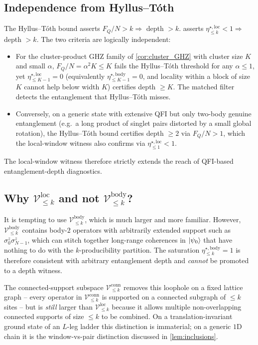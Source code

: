 \documentclass[11pt,a4paper]{article}
\newcommand{\FQ}{F_Q}
\newcommand{\PsiZ}{\ket{\psi_0}}
\newcommand{\Vbody}[1]{\mathcal{V}^{\mathrm{body}}_{\le #1}}
\newcommand{\Vconn}[1]{\mathcal{V}^{\mathrm{conn}}_{\le #1}}
\newcommand{\Vloc}[1]{\mathcal{V}^{\mathrm{loc}}_{\le #1}}
\newcommand{\etabody}[1]{\eta^{\star,\mathrm{body}}_{\le #1}}
\newcommand{\etaloc}[1]{\eta^{\star,\mathrm{loc}}_{\le #1}}
\begin{document}
\subsection{Independence from Hyllus--T\'oth}

The Hyllus--T\'oth bound asserts $\FQ/N>k\Rightarrow$ depth $>k$.
 asserts $\etaloc{k}<1\Rightarrow$ depth $>k$.
The two criteria are logically independent:
\begin{itemize}[leftmargin=2em]
\item For the cluster-product GHZ family of \cref{cor:cluster_GHZ}
with cluster size $K$ and small $\alpha$, $\FQ/N=\alpha^2K\le K$
fails the Hyllus--T\'oth threshold for any $\alpha\le1$, yet
$\etaloc{K-1}=0$ (equivalently $\etabody{K-1}=0$, and locality
within a block of size $K$ cannot help below width $K$) certifies
depth $\ge K$.  The matched filter detects the entanglement that
Hyllus--T\'oth misses.
\item Conversely, on a generic state with extensive QFI but only
two-body genuine entanglement (e.g.\ a long product of singlet
pairs distorted by a small global rotation), the Hyllus--T\'oth
bound certifies depth $\ge2$ via $\FQ/N>1$, which the local-window
witness also confirms via $\etaloc{1}<1$.
\end{itemize}
The local-window witness therefore strictly extends the reach of
QFI-based entanglement-depth diagnostics.

\subsection{Why $\Vloc{k}$ and not $\Vbody{k}$?}

It is tempting to use $\Vbody{k}$, which is much larger and more
familiar.  However, $\Vbody{k}$ contains body-$2$ operators with
arbitrarily extended support such as $\sigma^z_0\sigma^z_{N-1}$,
which can stitch together long-range coherences in $\PsiZ$ that
have nothing to do with the $k$-producibility partition.  The
saturation $\etabody{k}=1$ is therefore consistent with arbitrary
entanglement depth and \emph{cannot} be promoted to a depth
witness.

The connected-support subspace $\Vconn{k}$ removes this loophole
on a fixed lattice graph -- every operator in $\Vconn{k}$ is
supported on a connected subgraph of $\le k$ sites -- but is
\emph{still} larger than $\Vloc{k}$ because it allows multiple
non-overlapping connected supports of size $\le k$ to be combined.
On a translation-invariant ground state of an $L$-leg ladder this
distinction is immaterial; on a generic $1$D chain it is the
window-vs-pair distinction discussed in \cref{lem:inclusions}.
\end{document}
